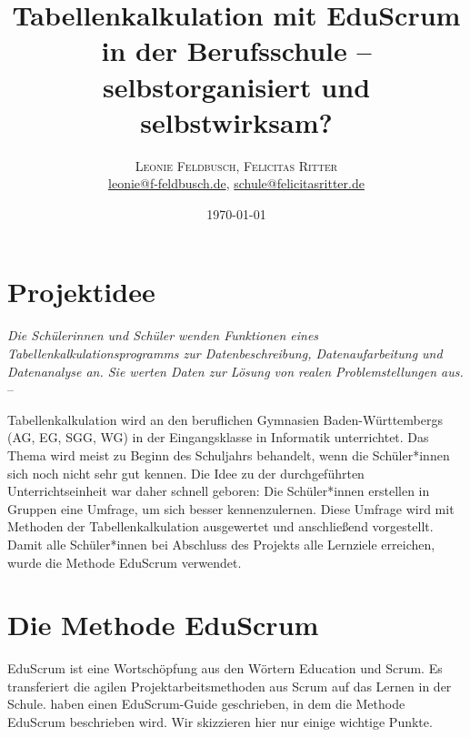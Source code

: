\documentclass[twoside,twocolumn]{article}
\title{Tabellenkalkulation mit EduScrum in der Berufsschule -- selbstorganisiert und selbstwirksam?} %
\author{%
\textsc{Leonie Feldbusch, Felicitas Ritter} \\[1ex] %
\normalsize \href{mailto:leonie@f-feldbusch.de}{leonie@f-feldbusch.de}, \href{mailto:schule@felicitasritter.de}{schule@felicitasritter.de} %
}
\date{\today} %
\begin{document}
\maketitle


\section{Projektidee}

\textit{Die Schülerinnen und Schüler wenden Funktionen eines Tabellenkalkulationsprogramms zur Datenbeschreibung, Datenaufarbeitung und Datenanalyse an. Sie werten Daten zur Lösung von realen Problemstellungen aus.} -- \cite{BP}

Tabellenkalkulation wird an den beruflichen Gymnasien Baden-Württembergs (AG, EG, SGG, WG) in der Eingangsklasse in Informatik unterrichtet. Das Thema wird meist zu Beginn des Schuljahrs behandelt, wenn die Schüler*innen sich noch nicht sehr gut kennen. Die Idee zu der durchgeführten Unterrichtseinheit war daher schnell geboren: Die Schüler*innen erstellen in Gruppen eine Umfrage, um sich besser kennenzulernen. Diese Umfrage wird mit Methoden der Tabellenkalkulation ausgewertet und anschließend vorgestellt. Damit alle Schüler*innen bei Abschluss des Projekts alle Lernziele erreichen, wurde die Methode EduScrum verwendet.


\section{Die Methode EduScrum}

EduScrum ist eine Wortschöpfung aus den Wörtern Education und Scrum. Es transferiert die agilen Projektarbeitsmethoden aus Scrum auf das Lernen in der Schule. \cite{guide} haben einen EduScrum-Guide geschrieben, in dem die Methode EduScrum beschrieben wird. Wir skizzieren hier nur einige wichtige Punkte.
\end{document}
